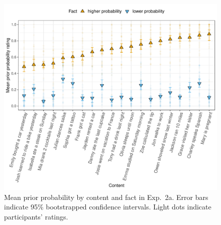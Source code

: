 \documentclass[11pt,fleqn]{article}
\newcommand{\6}{\mbox{$[\hspace*{-.6mm}[$}}
\newcommand{\9}{\mbox{$]\hspace*{-.6mm}]$}}
\begin{document}
\begin{figure}[h!]
\centering
\includegraphics[width=.75\paperwidth]{../../results/1-prior/graphs/prior-ratings}

\caption{Mean prior probability by content and fact in Exp.~2a. Error bars indicate 95\% bootstrapped confidence intervals. Light dots indicate participants' ratings.} 
\label{f-prior-2a}
\end{figure}
\end{document}
